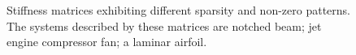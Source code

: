 \documentclass{elsarticle}
\begin{document}
\begin{figure}
\begin{subfigure}{0.3\textwidth}
				\caption{}
				\label{fig:mat_foil}
			\end{subfigure}
			\caption{Stiffness matrices exhibiting different sparsity and non-zero patterns. The systems described by these matrices are  notched beam;  jet engine compressor fan;  a laminar airfoil.}
			\label{fig:matrices}
		\end{figure}
		
		
		
		
\end{document}

